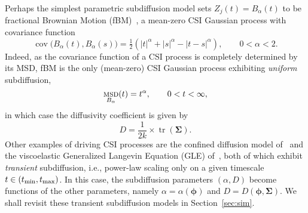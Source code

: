 \documentclass[article]{jss}
\newcommand{\nd}{k}
\newcommand{\aD}{(\alpha,D)}
\newcommand{\pph}{\bm{\phi}}
\newcommand{\SSi}{\bm{\Sigma}}
\newcommand{\XX}{\bm{X}}
\newcommand{\dt}{\Delta t}
\newcommand{\tmin}{t_{\textnormal{min}}}
\newcommand{\tmax}{t_{\textnormal{max}}}
\newcommand{\rv}[3][1]{#2_{#1},\ldots,#2_{#3}}
\DeclareMathOperator{\cov}{cov}
\DeclareMathOperator{\msd}{\textsc{msd}}
\DeclareMathOperator{\tr}{tr}
\begin{document}
Perhaps the simplest parametric subdiffusion model sets $Z_j(t) = B_\alpha(t)$ to be fractional Brownian Motion (fBM)~\citep[e.g.,][]{szymanski.weiss09,weiss13}, a mean-zero CSI Gaussian process with covariance function
\begin{equation}\label{eq:fbm-cov}
  \cov\bigl(B_\alpha(t), B_\alpha(s)\bigr) = \tfrac 1 2 (|t|^\alpha + |s|^\alpha - |t-s|^\alpha), \qquad 0 < \alpha < 2.
\end{equation}
Indeed, as the covariance function of a CSI process is completely determined by its MSD, fBM is the only (mean-zero) CSI Gaussian process exhibiting \emph{uniform} subdiffusion,
\begin{equation}\label{eq:fbm-msd}
  \msd_{B_\alpha}(t) = t^\alpha, \qquad 0 < t < \infty,
\end{equation}
in which case the diffusivity coefficient is given by
\[
  D = \frac{1}{2\nd} \times \tr(\SSi).
\]
Other examples of driving CSI processes are the confined diffusion model of~\cite{ernst.etal17} and the viscoelastic Generalized Langevin Equation (GLE) of~\cite{mckinley.etal09}, both of which exhibit \emph{transient}
subdiffusion, i.e., power-law scaling only on a given timescale $t \in (\tmin, \tmax)$. In this case, the subdiffusion parameters $\aD$ become functions of the other parameters, namely $\alpha = \alpha(\pph)$ and $D = D(\pph, \SSi)$.  We shall revisit these transient subdiffusion models in Section~\ref{sec:sim}.


\end{document}
